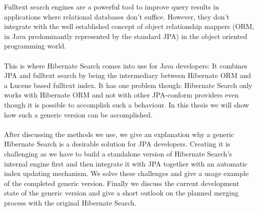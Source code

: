 Fulltext search engines are a powerful tool to improve query results in applications where relational databases don't suffice. However, they don't integrate with the well established concept of object relationship mappers (ORM, in Java predominantly represented by the standard JPA) in the object oriented programming world.
\\\\
This is where Hibernate Search comes into use for Java developers: It combines JPA and fulltext search by being the intermediary between Hibernate ORM and a Lucene based fulltext index. It has one problem though: Hibernate Search only works with Hibernate ORM and not with other JPA-conform providers even though it is possible to accomplish such a behaviour. In this thesis we will show how such a generic version can be accomplished.
\\\\
After discussing the methods we use, we give an explanation why a generic Hibernate Search is a desirable solution for JPA developers. Creating it is challenging as we have to build a standalone version of Hibernate Search's internal engine first and then integrate it with JPA together with an automatic index updating mechanism. We solve these challenges and give a usage example of the completed generic version. Finally we discuss the current development state of the generic version and give a short outlook on the planned merging process with the original Hibernate Search.
